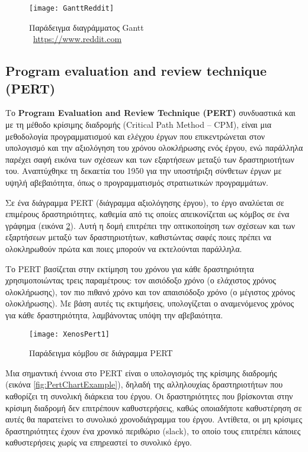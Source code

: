             \begin{figure}[h!] \noindent \centering
                \texttt{[image: GanttReddit]}
                \caption{Παράδειγμα διαγράμματος Gantt \\ {\footnotesize \textcopyright\ \url{https://www.reddit.com}}}
                \label{fig:GanttReddit}
            \end{figure}

        \subsection{Program evaluation and review technique (PERT)}
            Το \textbf{Program Evaluation and Review Technique (PERT)} συνδυαστικά και με τη μέθοδο κρίσιμης διαδρομής (Critical Path Method -- CPM), είναι μια μεθοδολογία προγραμματισμού και ελέγχου έργων που επικεντρώνεται στον υπολογισμό και την αξιολόγηση του χρόνου ολοκλήρωσης ενός έργου, ενώ παράλληλα παρέχει σαφή εικόνα των σχέσεων και των εξαρτήσεων μεταξύ των δραστηριοτήτων του. Αναπτύχθηκε τη δεκαετία του 1950 για την υποστήριξη σύνθετων έργων με υψηλή αβεβαιότητα, όπως ο προγραμματισμός στρατιωτικών προγραμμάτων.

            Σε ένα διάγραμμα PERT (διάγραμμα αξιολόγησης έργου), το έργο αναλύεται σε επιμέρους δραστηριότητες, καθεμία από τις οποίες απεικονίζεται ως κόμβος σε ένα γράφημα (εικόνα \ref{fig:XenosPert1}). Αυτή η δομή επιτρέπει την οπτικοποίηση των σχέσεων και των εξαρτήσεων μεταξύ των δραστηριοτήτων, καθιστώντας σαφές ποιες πρέπει να ολοκληρωθούν πρώτα και ποιες μπορούν να εκτελούνται παράλληλα.

            Το PERT βασίζεται στην εκτίμηση του χρόνου για κάθε δραστηριότητα χρησιμοποιώντας τρεις παραμέτρους: τον αισιόδοξο χρόνο (ο ελάχιστος χρόνος ολοκλήρωσης), τον πιο πιθανό χρόνο και τον απαισιόδοξο χρόνο (ο μέγιστος χρόνος ολοκλήρωσης). Με βάση αυτές τις εκτιμήσεις, υπολογίζεται ο αναμενόμενος χρόνος για κάθε δραστηριότητα, λαμβάνοντας υπόψη την αβεβαιότητα.

            \begin{figure}[h!] \noindent \centering
                \texttt{[image: XenosPert1]}
                \caption{Παράδειγμα κόμβου σε διάγραμμα PERT \cite{Xenos}}
                \label{fig:XenosPert1}
            \end{figure}

            Μια σημαντική έννοια στο PERT είναι ο υπολογισμός της κρίσιμης διαδρομής (εικόνα \ref{fig:PertChartExample}), δηλαδή της αλληλουχίας δραστηριοτήτων που καθορίζει τη συνολική διάρκεια του έργου. Οι δραστηριότητες που βρίσκονται στην κρίσιμη διαδρομή δεν επιτρέπουν καθυστερήσεις, καθώς οποιαδήποτε καθυστέρηση σε αυτές θα παρατείνει το συνολικό χρονοδιάγραμμα του έργου. Αντίθετα, οι μη κρίσιμες δραστηριότητες έχουν ένα χρονικό περιθώριο (slack), το οποίο τους επιτρέπει κάποιες καθυστερήσεις χωρίς να επηρεαστεί το συνολικό έργο.

